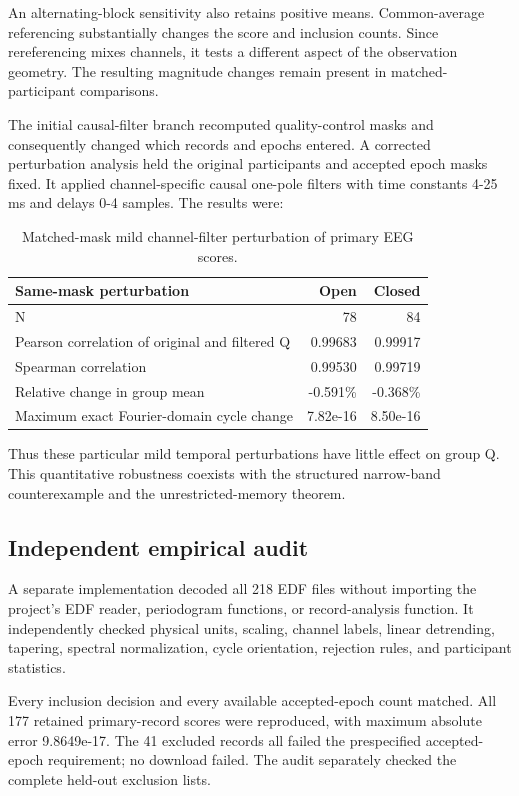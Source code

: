 \documentclass[11pt,a4paper]{article}
\begin{document}
An alternating-block sensitivity also retains positive means. Common-average referencing substantially changes the score and inclusion counts. Since rereferencing mixes channels, it tests a different aspect of the observation geometry. The resulting magnitude changes remain present in matched-participant comparisons.

The initial causal-filter branch recomputed quality-control masks and consequently changed which records and epochs entered. A corrected perturbation analysis held the original participants and accepted epoch masks fixed. It applied channel-specific causal one-pole filters with time constants 4-25 ms and delays 0-4 samples. The results were:

\begin{longtable}[]{@{}lrr@{}}
\caption{Matched-mask mild channel-filter perturbation of primary EEG scores.}\label{tab:s6}\\
\toprule\noalign{}
Same-mask perturbation & Open & Closed \\
\midrule\noalign{}
\endhead
\bottomrule\noalign{}
\endlastfoot
N & 78 & 84 \\
Pearson correlation of original and filtered Q & 0.99683 & 0.99917 \\
Spearman correlation & 0.99530 & 0.99719 \\
Relative change in group mean & -0.591\% & -0.368\% \\
Maximum exact Fourier-domain cycle change & 7.82e-16 & 8.50e-16 \\
\end{longtable}

Thus these particular mild temporal perturbations have little effect on group Q. This quantitative robustness coexists with the structured narrow-band counterexample and the unrestricted-memory theorem.

\subsection{Independent empirical audit}

A separate implementation decoded all 218 EDF files without importing the project's EDF reader, periodogram functions, or record-analysis function. It independently checked physical units, scaling, channel labels, linear detrending, tapering, spectral normalization, cycle orientation, rejection rules, and participant statistics.

Every inclusion decision and every available accepted-epoch count matched. All 177 retained primary-record scores were reproduced, with maximum absolute error 9.8649e-17. The 41 excluded records all failed the prespecified accepted-epoch requirement; no download failed. The audit separately checked the complete held-out exclusion lists.
\end{document}
